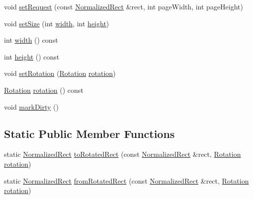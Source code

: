\begin{DoxyCompactItemize}
void \hyperlink{classOkular_1_1TilesManager_aa5ebf86d4e4b08313047d64bdd0a8005}{set\+Request} (const \hyperlink{classOkular_1_1NormalizedRect}{Normalized\+Rect} \&rect, int page\+Width, int page\+Height)
\item 
void \hyperlink{classOkular_1_1TilesManager_a166c51b55c3a95bd3595be62d986d744}{set\+Size} (int \hyperlink{classOkular_1_1TilesManager_a88a40f389b20ca54314754aff2392889}{width}, int \hyperlink{classOkular_1_1TilesManager_a4a2fc0597872d6cd291630c2e4bf6986}{height})
\item 
int \hyperlink{classOkular_1_1TilesManager_a88a40f389b20ca54314754aff2392889}{width} () const 
\item 
int \hyperlink{classOkular_1_1TilesManager_a4a2fc0597872d6cd291630c2e4bf6986}{height} () const 
\item 
void \hyperlink{classOkular_1_1TilesManager_a57c67565f8e21e5d62c89ae5ed116b99}{set\+Rotation} (\hyperlink{namespaceOkular_a8556d00465f61ef533c6b027669e7da6}{Rotation} \hyperlink{classOkular_1_1TilesManager_af09b92144bc61eb3d499e56b18bbba4f}{rotation})
\item 
\hyperlink{namespaceOkular_a8556d00465f61ef533c6b027669e7da6}{Rotation} \hyperlink{classOkular_1_1TilesManager_af09b92144bc61eb3d499e56b18bbba4f}{rotation} () const 
\item 
void \hyperlink{classOkular_1_1TilesManager_a53e88f49cd72c8a42e3c4688cce45225}{mark\+Dirty} ()
\end{DoxyCompactItemize}
\subsection*{Static Public Member Functions}
\begin{DoxyCompactItemize}
\item 
static \hyperlink{classOkular_1_1NormalizedRect}{Normalized\+Rect} \hyperlink{classOkular_1_1TilesManager_a8b508663bb7da186b67078143853a458}{to\+Rotated\+Rect} (const \hyperlink{classOkular_1_1NormalizedRect}{Normalized\+Rect} \&rect, \hyperlink{namespaceOkular_a8556d00465f61ef533c6b027669e7da6}{Rotation} \hyperlink{classOkular_1_1TilesManager_af09b92144bc61eb3d499e56b18bbba4f}{rotation})
\item 
static \hyperlink{classOkular_1_1NormalizedRect}{Normalized\+Rect} \hyperlink{classOkular_1_1TilesManager_a3471602199e2194087e90a3970d07c6c}{from\+Rotated\+Rect} (const \hyperlink{classOkular_1_1NormalizedRect}{Normalized\+Rect} \&rect, \hyperlink{namespaceOkular_a8556d00465f61ef533c6b027669e7da6}{Rotation} \hyperlink{classOkular_1_1TilesManager_af09b92144bc61eb3d499e56b18bbba4f}{rotation})
\end{DoxyCompactItemize}
